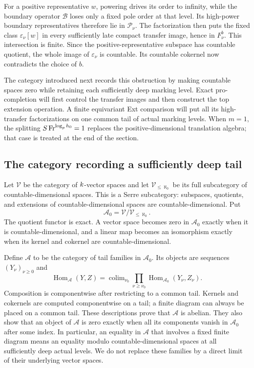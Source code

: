 For a positive representative $w$, powering drives its order to
infinity, while the boundary operator $\mathcal B$ loses only a fixed
pole order at that level. Its high-power boundary representatives
therefore lie in $\mathcal P_\nu$. The factorization then puts the
fixed class $\varepsilon_\nu[w]$ in every sufficiently late compact
transfer image, hence in $F^b_\nu$. This intersection is finite. Since
the positive-representative subspace has countable quotient, the whole
image of $\varepsilon_\nu$ is countable. Its countable cokernel now
contradicts the choice of $b$.

The category introduced next records this obstruction by making
countable spaces zero while retaining each sufficiently deep marking
level. Exact pro-completion will first control the transfer images and
then construct the top extension operation. A finite equivariant Ext
comparison will put all its high-transfer factorizations on one common
tail of actual marking levels. When $m=1$, the splitting
$S\operatorname{Fr}^{\log_p h_0}=1$ replaces the positive-dimensional translation
algebra; that case is treated at the end of the section.

\subsection{The category recording a sufficiently deep tail}

Let $\mathcal V$ be the category of $k$-vector spaces and let
$\mathcal V_{\leq\aleph_0}$ be its full subcategory of
countable-dimensional spaces.  This is a Serre subcategory: subspaces,
quotients, and extensions of countable-dimensional spaces are
countable-dimensional.  Put
\[
 \mathcal A_0=\mathcal V/\mathcal V_{\leq\aleph_0}.
\]
The quotient functor is exact.  A vector space becomes zero in
$\mathcal A_0$ exactly when it is countable-dimensional, and a linear
map becomes an isomorphism exactly when its kernel and cokernel are
countable-dimensional.

Define $\mathcal A$ to be the category of tail families in
$\mathcal A_0$.  Its objects are sequences $(Y_\nu)_{\nu\geq0}$ and
\[
 \operatorname{Hom}_{\mathcal A}(Y,Z)
 =\mathop{\operatorname{colim}}_{\nu_0}
   \prod_{\nu\geq\nu_0}
   \operatorname{Hom}_{\mathcal A_0}(Y_\nu,Z_\nu).
\]
Composition is componentwise after restricting to a common tail.
Kernels and cokernels are computed componentwise on a tail; a finite
diagram can always be placed on a common tail.  These descriptions
prove that $\mathcal A$ is abelian.  They also show that an object of
$\mathcal A$ is zero exactly when all its components vanish in
$\mathcal A_0$ after some index.  In particular, an equality in
$\mathcal A$ that involves a fixed finite diagram means an equality
modulo countable-dimensional spaces at all sufficiently deep actual
levels.  We do not replace these families by a direct limit of their
underlying vector spaces.

